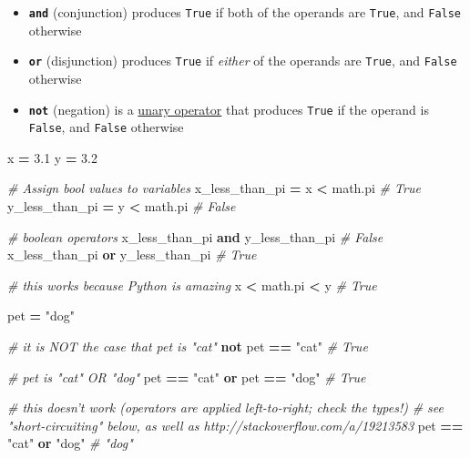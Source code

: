 \documentclass[]{book}
\newenvironment{Shaded}{\begin{snugshade}}{\end{snugshade}}
\newcommand{\KeywordTok}[1]{\textcolor[rgb]{0.13,0.29,0.53}{\textbf{#1}}}
\newcommand{\FloatTok}[1]{\textcolor[rgb]{0.00,0.00,0.81}{#1}}
\newcommand{\StringTok}[1]{\textcolor[rgb]{0.31,0.60,0.02}{#1}}
\newcommand{\CommentTok}[1]{\textcolor[rgb]{0.56,0.35,0.01}{\textit{#1}}}
\newcommand{\OperatorTok}[1]{\textcolor[rgb]{0.81,0.36,0.00}{\textbf{#1}}}
\newcommand{\NormalTok}[1]{#1}
\providecommand{\tightlist}{%
  \setlength{\itemsep}{0pt}\setlength{\parskip}{0pt}}
\begin{document}
\begin{itemize}
\tightlist
\item
  \textbf{\texttt{and}} (conjunction) produces \texttt{True} if both of
  the operands are \texttt{True}, and \texttt{False} otherwise
\item
  \textbf{\texttt{or}} (disjunction) produces \texttt{True} if
  \emph{either} of the operands are \texttt{True}, and \texttt{False}
  otherwise
\item
  \textbf{\texttt{not}} (negation) is a
  \href{https://en.wikipedia.org/wiki/Unary_operation}{unary operator}
  that produces \texttt{True} if the operand is \texttt{False}, and
  \texttt{False} otherwise
\end{itemize}

\begin{Shaded}
\begin{Highlighting}[]
\NormalTok{x }\OperatorTok{=} \FloatTok{3.1}
\NormalTok{y }\OperatorTok{=} \FloatTok{3.2}

\CommentTok{# Assign bool values to variables}
\NormalTok{x_less_than_pi }\OperatorTok{=}\NormalTok{ x }\OperatorTok{<}\NormalTok{ math.pi  }\CommentTok{# True}
\NormalTok{y_less_than_pi }\OperatorTok{=}\NormalTok{ y }\OperatorTok{<}\NormalTok{ math.pi  }\CommentTok{# False}

\CommentTok{# boolean operators}
\NormalTok{x_less_than_pi }\KeywordTok{and}\NormalTok{ y_less_than_pi  }\CommentTok{# False}
\NormalTok{x_less_than_pi }\KeywordTok{or}\NormalTok{ y_less_than_pi  }\CommentTok{# True}

\CommentTok{# this works because Python is amazing}
\NormalTok{x }\OperatorTok{<}\NormalTok{ math.pi }\OperatorTok{<}\NormalTok{ y  }\CommentTok{# True}


\NormalTok{pet }\OperatorTok{=} \StringTok{"dog"}

\CommentTok{# it is NOT the case that pet is "cat"}
\KeywordTok{not}\NormalTok{ pet }\OperatorTok{==} \StringTok{"cat"}  \CommentTok{# True}

\CommentTok{# pet is "cat" OR "dog"}
\NormalTok{pet }\OperatorTok{==} \StringTok{"cat"} \KeywordTok{or}\NormalTok{ pet }\OperatorTok{==} \StringTok{"dog"}  \CommentTok{# True}

\CommentTok{# this doesn't work (operators are applied left-to-right; check the types!)}
\CommentTok{# see "short-circuiting" below, as well as http://stackoverflow.com/a/19213583}
\NormalTok{pet }\OperatorTok{==} \StringTok{"cat"} \KeywordTok{or} \StringTok{"dog"}  \CommentTok{# "dog"}
\end{Highlighting}
\end{Shaded}
\end{document}
